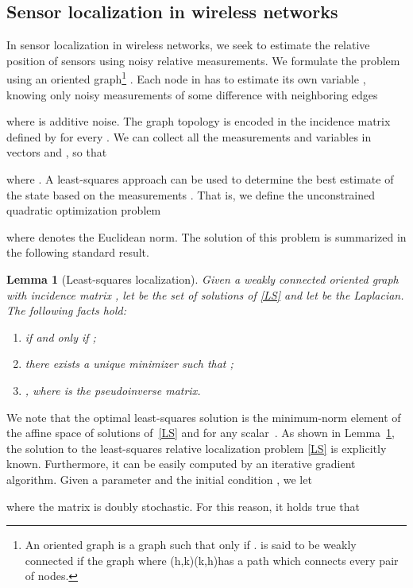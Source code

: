 \documentclass{IEEEtran}
\newtheorem{lemma}{Lemma}
\newcommand{\1}{\mathbf{1}} \newcommand{\ind}{\mathds{1}}
\begin{document}
\subsection{Sensor localization in wireless networks}
\label{es1}
In sensor localization in wireless networks, we seek to estimate the relative position of sensors using noisy relative measurements. We formulate the problem using an oriented graph\footnote{
An oriented graph  is a graph such that  only if .  is said to be weakly connected if the graph  where (h,k)\in \E(k,h)\in \E  has a path which connects every pair of nodes.} 
 .
Each node  in  has to estimate its own variable 
, knowing only noisy measurements of some difference with neighboring edges

where  is additive noise.
The graph topology is encoded in the incidence matrix  defined by 
 for every . We can collect all the measurements and variables in vectors  and , so that 

where . 
A least-squares approach can be used to determine the best estimate of the state  based on the measurements . That is, we define the unconstrained quadratic optimization problem

where  denotes the Euclidean norm.
The solution of this problem is summarized in the following standard result.
\begin{lemma}[Least-squares localization]
\label{lemma:centralized-LS} 
Given a weakly connected oriented graph
 with incidence matrix , let  be the set of solutions of \eqref{LS} and let  be the Laplacian. The following facts hold:
\begin{enumerate}
\item  if and only if ;
\item there exists a unique minimizer  such that ;
\item ,
where  is the pseudoinverse matrix.
\end{enumerate}
\end{lemma}

We note that the optimal least-squares solution  is the minimum-norm element of the affine space of solutions of~\eqref{LS} and  for any scalar~.
As shown in Lemma~\ref{lemma:centralized-LS}, the solution to the least-squares relative localization problem \eqref{LS} is explicitly known. Furthermore, it can be easily computed by an iterative gradient algorithm.
Given a parameter  and the initial condition , we let 

where the matrix  is doubly stochastic. For this reason, it holds true that
\end{document}
